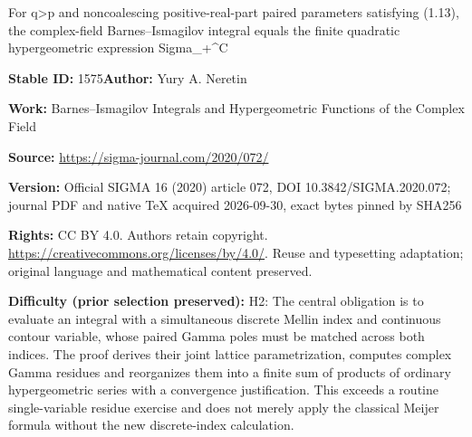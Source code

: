\documentclass[11pt]{article}
\numberwithin{equation}{section}
\numberwithin{equation}{section}
\begin{document}
\begin{center}\Large For q>p and noncoalescing positive-real-part paired parameters satisfying (1.13), the complex-field Barnes–Ismagilov integral equals the finite quadratic hypergeometric expression Sigma\_+\textasciicircum{}C\end{center}
\noindent\textbf{Stable ID:} 1575\quad\textbf{Author:} Yury A. Neretin\par
\noindent\textbf{Work:} Barnes--Ismagilov Integrals and Hypergeometric Functions of the Complex Field\par
\noindent\textbf{Source:} \url{https://sigma-journal.com/2020/072/}\par
\noindent\textbf{Version:} Official SIGMA 16 (2020) article 072, DOI 10.3842/SIGMA.2020.072; journal PDF and native TeX acquired 2026-09-30, exact bytes pinned by SHA256\par
\noindent\textbf{Rights:} CC BY 4.0. Authors retain copyright. \url{https://creativecommons.org/licenses/by/4.0/}. Reuse and typesetting adaptation; original language and mathematical content preserved.\par
\noindent\textbf{Difficulty (prior selection preserved):} {\CJKfont H2: The central obligation is to evaluate an integral with a simultaneous discrete Mellin index and continuous contour variable, whose paired Gamma poles must be matched across both indices. The proof derives their joint lattice parametrization, computes complex Gamma residues and reorganizes them into a finite sum of products of ordinary hypergeometric series with a convergence justification. This exceeds a routine single-variable residue exercise and does not merely apply the classical Meijer formula without the new discrete-index calculation.}\par
\end{document}
